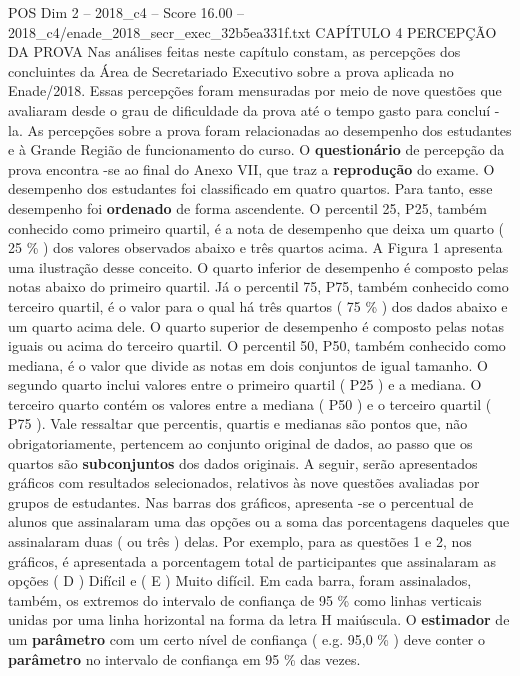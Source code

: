 \begin{textsample}{POS Dim 2 – 2018\_c4 – Score 16.00 – 2018\_c4/enade\_2018\_secr\_exec\_32b5ea331f.txt}  \label{ex:f2_pos_053}
CAPÍTULO 4 PERCEPÇÃO DA PROVA Nas análises feitas neste capítulo constam, as percepções dos concluintes da Área de Secretariado Executivo sobre a prova aplicada no Enade/2018.
Essas percepções foram mensuradas por meio de nove questões que avaliaram desde o grau de dificuldade da prova até o tempo gasto para concluí -la.
As percepções sobre a prova foram relacionadas ao desempenho dos estudantes e à Grande Região de funcionamento do curso.
O \textbf{questionário} de percepção da prova encontra -se ao final do Anexo VII, que traz a \textbf{reprodução} do exame.
O desempenho dos estudantes foi classificado em quatro quartos.
Para tanto, esse desempenho foi \textbf{ordenado} de forma ascendente.
O percentil 25, P25, também conhecido como primeiro quartil, é a nota de desempenho que deixa um quarto ( 25 \% ) dos valores observados abaixo e três quartos acima.
A Figura 1 apresenta uma ilustração desse conceito.
O quarto inferior de desempenho é composto pelas notas abaixo do primeiro quartil.
Já o percentil 75, P75, também conhecido como terceiro quartil, é o valor para o qual há três quartos ( 75 \% ) dos dados abaixo e um quarto acima dele.
O quarto superior de desempenho é composto pelas notas iguais ou acima do terceiro quartil.
O percentil 50, P50, também conhecido como mediana, é o valor que divide as notas em dois conjuntos de igual tamanho.
O segundo quarto inclui valores entre o primeiro quartil ( P25 ) e a mediana.
O terceiro quarto contém os valores entre a mediana ( P50 ) e o terceiro quartil ( P75 ).
Vale ressaltar que percentis, quartis e medianas são pontos que, não obrigatoriamente, pertencem ao conjunto original de dados, ao passo que os quartos são \textbf{subconjuntos} dos dados originais.
A seguir, serão apresentados gráficos com resultados selecionados, relativos às nove questões avaliadas por grupos de estudantes.
Nas barras dos gráficos, apresenta -se o percentual de alunos que assinalaram uma das opções ou a soma das porcentagens daqueles que assinalaram duas ( ou três ) delas.
Por exemplo, para as questões 1 e 2, nos gráficos, é apresentada a porcentagem total de participantes que assinalaram as opções ( D ) Difícil e ( E ) Muito difícil.
Em cada barra, foram assinalados, também, os extremos do intervalo de confiança de 95 \% como linhas verticais unidas por uma linha horizontal na forma da letra H maiúscula.
O \textbf{estimador} de um \textbf{parâmetro} com um certo nível de confiança ( e.g. 95,0 \% ) deve conter o \textbf{parâmetro} no intervalo de confiança em 95 \% das vezes.

\end{textsample}
